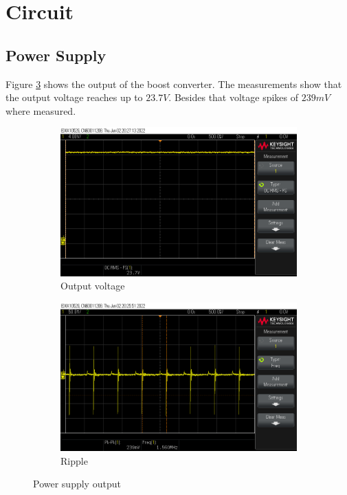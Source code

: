 \section{Circuit}

\subsection{Power Supply}

Figure \ref{fig:meas:circ:power} shows the output of the boost converter. The measurements show that the output voltage reaches up to $23.7V$. Besides that voltage spikes of $239mV$ where measured.
%
\begin{figure}
  \centering
  \begin{subfigure}[b]{0.8\textwidth}
    \includegraphics[width=\textwidth]{src/assets/pictures/measurements/power_output_voltage.png}
    \caption{Output voltage}
    \label{fig:meas:circ:power_out}
  \end{subfigure}
  \hfill
  \begin{subfigure}[b]{0.8\textwidth}
    \includegraphics[width=\textwidth]{src/assets/pictures/measurements/power_ripple.png}
    \caption{Ripple}
    \label{fig:meas:circ:power_ripple}
  \end{subfigure}
  \caption{Power supply output}
  \label{fig:meas:circ:power}
\end{figure}

